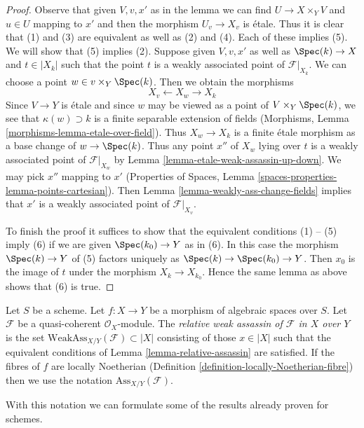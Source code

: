 \begin{proof}
Observe that given $V, v, x'$ as in the lemma we can find
$U \to X \times_Y V$ and $u \in U$ mapping to $x'$
and then the morphism $U_v \to X_v$ is \'etale.
Thus it is clear that (1) and (3) are equivalent
as well as (2) and (4). Each of these implies (5).
We will show that (5) implies (2).
Suppose given $V, v, x'$ as well as $\Spec(k) \to X$ and $t \in |X_k|$
such that the point $t$ is a weakly
associated point of $\mathcal{F}|_{X_k}$.
We can choose a point $w \in v \times_Y \Spec(k)$.
Then we obtain the morphisms
$$
X_v \longleftarrow X_w \longrightarrow X_k
$$
Since $V \to Y$ is \'etale and since $w$ may be viewed as a point of
$V \times_Y \Spec(k)$, we see that $\kappa(w) \supset k$
is a finite separable extension of fields
(Morphisms, Lemma \ref{morphisms-lemma-etale-over-field}).
Thus $X_w \to X_k$ is a finite \'etale morphism as a base change of
$w \to \Spec(k)$. Thus any point $x''$ of $X_w$ lying over $t$
is a weakly associated point of $\mathcal{F}|_{X_w}$ by
Lemma \ref{lemma-etale-weak-assassin-up-down}.
We may pick $x''$ mapping to $x'$
(Properties of Spaces, Lemma \ref{spaces-properties-lemma-points-cartesian}).
Then Lemma \ref{lemma-weakly-ass-change-fields}
implies that $x'$ is a weakly associated
point of $\mathcal{F}|_{X_v}$.

\medskip\noindent
To finish the proof it suffices to show that the equivalent
conditions (1) -- (5) imply (6) if we are given
$\Spec(k_0) \to Y$ as in (6). In this case the morphism
$\Spec(k) \to Y$ of (5) factors uniquely as $\Spec(k) \to \Spec(k_0) \to Y$.
Then $x_0$ is the image of $t$ under the morphism $X_k \to X_{k_0}$.
Hence the same lemma as above shows that (6) is true.
\end{proof}

\begin{definition}
\label{definition-relative-weak-assassin}
Let $S$ be a scheme. Let $f : X \to Y$ be a morphism of algebraic spaces
over $S$. Let $\mathcal{F}$ be a quasi-coherent $\mathcal{O}_X$-module.
The {\it relative weak assassin of $\mathcal{F}$ in $X$ over $Y$}
is the set $\text{WeakAss}_{X/Y}(\mathcal{F}) \subset |X|$
consisting of those $x \in |X|$ such that the equivalent conditions of
Lemma \ref{lemma-relative-assassin} are satisfied.
If the fibres of $f$ are locally Noetherian
(Definition \ref{definition-locally-Noetherian-fibre})
then we use the notation $\text{Ass}_{X/Y}(\mathcal{F})$.
\end{definition}

\noindent
With this notation we can formulate some of the results
already proven for schemes.

